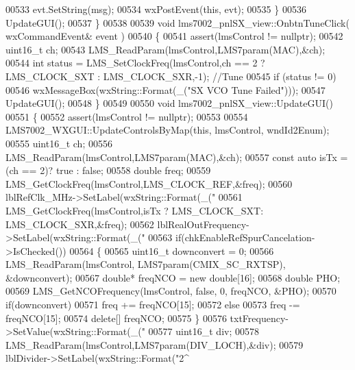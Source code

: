 \begin{DoxyCode}
{{{{{{{{{{{{{{{{{{{{{{{{{{{{{{{{{{{{{{{{{{{{{{{{{{{{{{{{{{{{{{{{{{{{{{{{{{{{{{{{{{{{{{{{{{{{{{{{{{{{{{{{{{{{{{{{{{{{{{{{{{{{{{{{{{{{{{{{{{{{{{{{{{{{{{{{{{{{{{{{{{{{{{{{{{{{{{{{{{{{{{{{{{{{{{{{{{{{{{{{{{{{{{{{{{{{{{{{{{{{{{{{{{{{{{{{{{{{{{{{{{{{{{{{{{{{{{{{{{{{{{{{{{00533         evt.SetString(msg);
00534         wxPostEvent(\textcolor{keyword}{this}, evt);
00535     \}
00536     UpdateGUI();
00537 \}
00538 
00539 \textcolor{keywordtype}{void} lms7002_pnlSX_view::OnbtnTuneClick( wxCommandEvent& event )
00540 \{
00541     assert(lmsControl != \textcolor{keyword}{nullptr});
00542     uint16\_t ch;
00543     LMS_ReadParam(lmsControl,LMS7param(MAC),&ch);
00544     \textcolor{keywordtype}{int} status = LMS_SetClockFreq(lmsControl,ch == 2 ? LMS_CLOCK_SXT : 
      LMS_CLOCK_SXR,-1); \textcolor{comment}{//Tune}
00545     \textcolor{keywordflow}{if} (status != 0)
00546         wxMessageBox(wxString::Format(\_(\textcolor{stringliteral}{"SX VCO Tune Failed"})));
00547     UpdateGUI();
00548 \}
00549 
00550 \textcolor{keywordtype}{void} lms7002_pnlSX_view::UpdateGUI()
00551 \{
00552     assert(lmsControl != \textcolor{keyword}{nullptr});
00553 
00554     LMS7002_WXGUI::UpdateControlsByMap(\textcolor{keyword}{this}, lmsControl, wndId2Enum);
00555     uint16\_t ch;
00556     LMS_ReadParam(lmsControl,LMS7param(MAC),&ch);
00557     \textcolor{keyword}{const} \textcolor{keyword}{auto} isTx = (ch == 2)? \textcolor{keyword}{true} : \textcolor{keyword}{false};
00558     \textcolor{keywordtype}{double} freq;
00559     LMS_GetClockFreq(lmsControl,LMS_CLOCK_REF,&freq);
00560     lblRefClk_MHz->SetLabel(wxString::Format(\_(\textcolor{stringliteral}{"%
00561     LMS_GetClockFreq(lmsControl,isTx ? LMS_CLOCK_SXT: LMS_CLOCK_SXR,&freq);
00562     lblRealOutFrequency->SetLabel(wxString::Format(\_(\textcolor{stringliteral}{"%
00563     \textcolor{keywordflow}{if}(chkEnableRefSpurCancelation->IsChecked())
00564     \{
00565         uint16\_t downconvert = 0;
00566         LMS_ReadParam(lmsControl, LMS7param(CMIX_SC_RXTSP), &downconvert);
00567         \textcolor{keywordtype}{double}* freqNCO = \textcolor{keyword}{new} \textcolor{keywordtype}{double}[16];
00568         \textcolor{keywordtype}{double} PHO;
00569         LMS_GetNCOFrequency(lmsControl, \textcolor{keyword}{false}, 0, freqNCO, &PHO);
00570         \textcolor{keywordflow}{if}(downconvert)
00571             freq += freqNCO[15];
00572         \textcolor{keywordflow}{else}
00573             freq -= freqNCO[15];
00574         \textcolor{keyword}{delete}[] freqNCO;
00575     \}
00576     txtFrequency->SetValue(wxString::Format(\_(\textcolor{stringliteral}{"%
00577     uint16\_t div;
00578     LMS_ReadParam(lmsControl,LMS7param(DIV_LOCH),&div);
00579     lblDivider->SetLabel(wxString::Format(\textcolor{stringliteral}{"2^%
}}}}}}}}}}}}}}}}}}}}}}}}}}}}}}}}}}}}}}}}}}}}}}}}}}}}}}}}}}}}}}}}}}}}}}}}}}}}}}}}}}}}}}}}}}}}}}}}}}}}}}}}}}}}}}}}}}}}}}}}}}}}}}}}}}}}}}}}}}}}}}}}}}}}}}}}}}}}}}}}}}}}}}}}}}}}}}}}}}}}}}}}}}}}}}}}}}}}}}}}}}}}}}}}}}}}}}}}}}}}}}}}}}}}}}}}}}}}}}}}}}}}}}}}}}}}}}}}}}}}}}}}}}}}}}
\end{DoxyCode}
